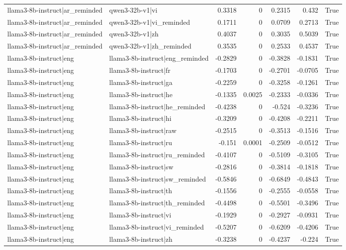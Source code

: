 \begin{table}
\begin{tabular}{l l r r r r l}
llama3-8b-instruct|ar_reminded & qwen3-32b-v1|vi & 0.3318 & 0 & 0.2315 & 0.432 & True \\
llama3-8b-instruct|ar_reminded & qwen3-32b-v1|vi_reminded & 0.1711 & 0 & 0.0709 & 0.2713 & True \\
llama3-8b-instruct|ar_reminded & qwen3-32b-v1|zh & 0.4037 & 0 & 0.3035 & 0.5039 & True \\
llama3-8b-instruct|ar_reminded & qwen3-32b-v1|zh_reminded & 0.3535 & 0 & 0.2533 & 0.4537 & True \\
llama3-8b-instruct|eng & llama3-8b-instruct|eng_reminded & -0.2829 & 0 & -0.3828 & -0.1831 & True \\
llama3-8b-instruct|eng & llama3-8b-instruct|fr & -0.1703 & 0 & -0.2701 & -0.0705 & True \\
llama3-8b-instruct|eng & llama3-8b-instruct|ga & -0.2259 & 0 & -0.3258 & -0.1261 & True \\
llama3-8b-instruct|eng & llama3-8b-instruct|he & -0.1335 & 0.0025 & -0.2333 & -0.0336 & True \\
llama3-8b-instruct|eng & llama3-8b-instruct|he_reminded & -0.4238 & 0 & -0.524 & -0.3236 & True \\
llama3-8b-instruct|eng & llama3-8b-instruct|hi & -0.3209 & 0 & -0.4208 & -0.2211 & True \\
llama3-8b-instruct|eng & llama3-8b-instruct|raw & -0.2515 & 0 & -0.3513 & -0.1516 & True \\
llama3-8b-instruct|eng & llama3-8b-instruct|ru & -0.151 & 0.0001 & -0.2509 & -0.0512 & True \\
llama3-8b-instruct|eng & llama3-8b-instruct|ru_reminded & -0.4107 & 0 & -0.5109 & -0.3105 & True \\
llama3-8b-instruct|eng & llama3-8b-instruct|sw & -0.2816 & 0 & -0.3814 & -0.1818 & True \\
llama3-8b-instruct|eng & llama3-8b-instruct|sw_reminded & -0.5846 & 0 & -0.6849 & -0.4843 & True \\
llama3-8b-instruct|eng & llama3-8b-instruct|th & -0.1556 & 0 & -0.2555 & -0.0558 & True \\
llama3-8b-instruct|eng & llama3-8b-instruct|th_reminded & -0.4498 & 0 & -0.5501 & -0.3496 & True \\
llama3-8b-instruct|eng & llama3-8b-instruct|vi & -0.1929 & 0 & -0.2927 & -0.0931 & True \\
llama3-8b-instruct|eng & llama3-8b-instruct|vi_reminded & -0.5207 & 0 & -0.6209 & -0.4206 & True \\
llama3-8b-instruct|eng & llama3-8b-instruct|zh & -0.3238 & 0 & -0.4237 & -0.224 & True \\

\end{tabular}
\end{table}
